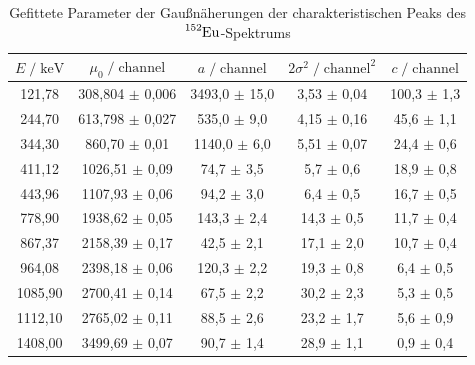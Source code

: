 \begin{table}
  \small
  \centering
  \caption{Gefittete Parameter der Gaußnäherungen der charakteristischen Peaks des $\ce{^{152}Eu}$-Spektrums}
  \label{tab:mess1}
  \begin{tabular}{c c c c c}
  \toprule
  $ E \;/\; \si{\kilo\eV}$ & $\mu_0 \;/\; \text{channel}$ & $a \;/\; \text{channel}$ & $2\sigma^2 \;/\; \text{channel}^2$ & $c \;/\; \text{channel}$ \\
  \midrule
        121,78 &  308,804 $\pm$ 0,006 & 3493,0 $\pm$ 15,0 &  3,53 $\pm$ 0,04 & 100,3 $\pm$ 1,3 \\
        244,70 &  613,798 $\pm$ 0,027 &  535,0 $\pm$  9,0 &  4,15 $\pm$ 0,16 &  45,6 $\pm$ 1,1 \\
        344,30 &  860,70  $\pm$ 0,01  & 1140,0 $\pm$  6,0 &  5,51 $\pm$ 0,07 &  24,4 $\pm$ 0,6 \\
        411,12 & 1026,51  $\pm$ 0,09  &   74,7 $\pm$  3,5 &  5,7  $\pm$ 0,6  &  18,9 $\pm$ 0,8 \\
        443,96 & 1107,93  $\pm$ 0,06  &   94,2 $\pm$  3,0 &  6,4  $\pm$ 0,5  &  16,7 $\pm$ 0,5 \\
        778,90 & 1938,62  $\pm$ 0,05  &  143,3 $\pm$  2,4 & 14,3  $\pm$ 0,5  &  11,7 $\pm$ 0,4 \\
        867,37 & 2158,39  $\pm$ 0,17  &   42,5 $\pm$  2,1 & 17,1  $\pm$ 2,0  &  10,7 $\pm$ 0,4 \\
        964,08 & 2398,18  $\pm$ 0,06  &  120,3 $\pm$  2,2 & 19,3  $\pm$ 0,8  &   6,4 $\pm$ 0,5 \\
       1085,90 & 2700,41  $\pm$ 0,14  &   67,5 $\pm$  2,2 & 30,2  $\pm$ 2,3  &   5,3 $\pm$ 0,5 \\
       1112,10 & 2765,02  $\pm$ 0,11  &   88,5 $\pm$  2,6 & 23,2  $\pm$ 1,7  &   5,6 $\pm$ 0,9 \\
       1408,00 & 3499,69  $\pm$ 0,07  &   90,7 $\pm$  1,4 & 28,9  $\pm$ 1,1  &   0,9 $\pm$ 0,4 \\
  \bottomrule
  \end{tabular}
  \end{table}

